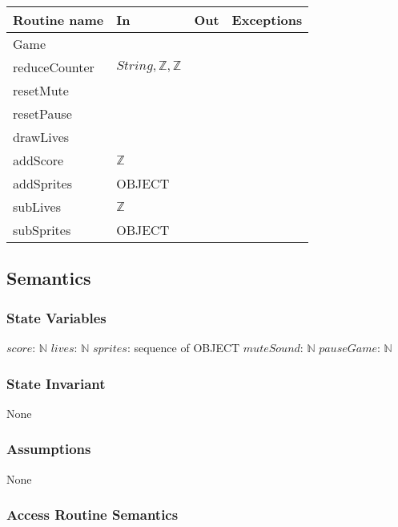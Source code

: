 \documentclass[12pt]{article}
\begin{document}
\newpage %

\begin{tabular}{| l | l | l | l |}
\hline
\textbf{Routine name} & \textbf{In} & \textbf{Out} & \textbf{Exceptions}\\
\hline
Game &  & ~\\
\hline
reduceCounter & $String, \mathbb{Z}, \mathbb{Z}$ &  & ~\\
\hline
resetMute &  &  & ~\\
\hline
resetPause &  &  & ~\\
\hline
drawLives &  &  & ~\\
\hline
addScore & $\mathbb{Z}$ &  & ~\\
\hline
addSprites & OBJECT &  & ~\\
\hline
subLives & $\mathbb{Z}$ &  & ~\\
\hline
subSprites & OBJECT &  & ~\\
\hline
\end{tabular}

\subsection*{Semantics}

\subsubsection*{State Variables}

$score$: $\mathbb{N}$
$lives$: $\mathbb{N}$
$sprites$: sequence of OBJECT
$muteSound$: $\mathbb{N}$
$pauseGame$: $\mathbb{N}$

\subsubsection*{State Invariant}

None

\subsubsection*{Assumptions}

%

None

\subsubsection*{Access Routine Semantics}
\end{document}
